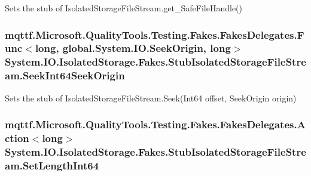 Sets the stub of Isolated\-Storage\-File\-Stream.\-get\-\_\-\-Safe\-File\-Handle()

\hypertarget{class_system_1_1_i_o_1_1_isolated_storage_1_1_fakes_1_1_stub_isolated_storage_file_stream_a2c7eb15d4d844cb8633689d63597a4e2}{
\subsubsection[{Seek\-Int64\-Seek\-Origin}]{\setlength{\rightskip}{0pt plus 5cm}mqttf.\-Microsoft.\-Quality\-Tools.\-Testing.\-Fakes.\-Fakes\-Delegates.\-Func$<$long, global.\-System.\-I\-O.\-Seek\-Origin, long$>$ System.\-I\-O.\-Isolated\-Storage.\-Fakes.\-Stub\-Isolated\-Storage\-File\-Stream.\-Seek\-Int64\-Seek\-Origin}}\label{class_system_1_1_i_o_1_1_isolated_storage_1_1_fakes_1_1_stub_isolated_storage_file_stream_a2c7eb15d4d844cb8633689d63597a4e2}


Sets the stub of Isolated\-Storage\-File\-Stream.\-Seek(\-Int64 offset, Seek\-Origin origin)

\hypertarget{class_system_1_1_i_o_1_1_isolated_storage_1_1_fakes_1_1_stub_isolated_storage_file_stream_a20952ce44d028dfd3cdd30dc94a1ab9f}{
\subsubsection[{Set\-Length\-Int64}]{\setlength{\rightskip}{0pt plus 5cm}mqttf.\-Microsoft.\-Quality\-Tools.\-Testing.\-Fakes.\-Fakes\-Delegates.\-Action$<$long$>$ System.\-I\-O.\-Isolated\-Storage.\-Fakes.\-Stub\-Isolated\-Storage\-File\-Stream.\-Set\-Length\-Int64}}\label{class_system_1_1_i_o_1_1_isolated_storage_1_1_fakes_1_1_stub_isolated_storage_file_stream_a20952ce44d028dfd3cdd30dc94a1ab9f}


